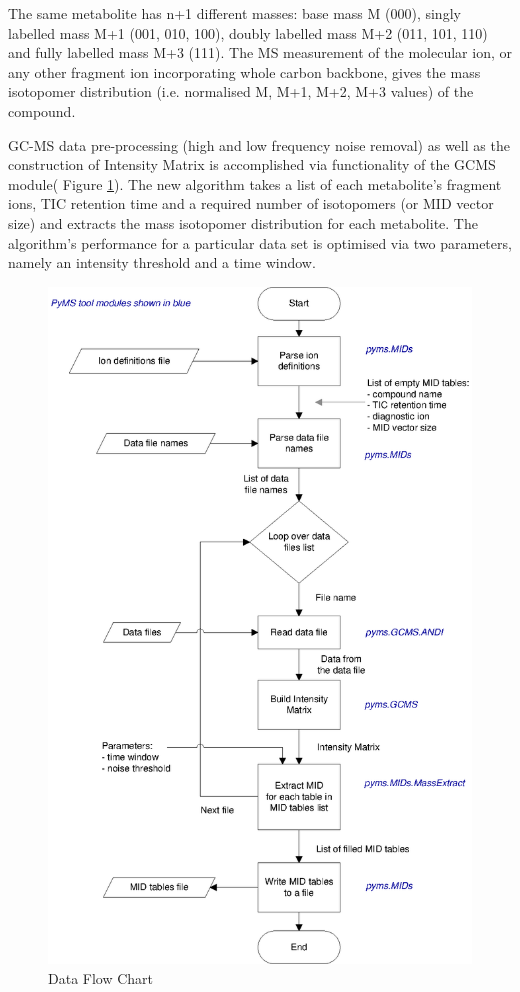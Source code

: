 The same metabolite has n+1 different masses: base mass M (000), singly labelled
mass M+1 (001, 010, 100), doubly labelled mass M+2 (011, 101, 110) and fully 
labelled mass M+3 (111). The MS measurement of the molecular ion, or any other 
fragment ion incorporating whole carbon backbone,  gives the mass isotopomer 
distribution (i.e. normalised M, M+1, M+2, M+3 values) of the compound.

GC-MS data pre-processing (high and low frequency noise removal) as well as the 
construction of Intensity Matrix is accomplished via functionality of the GCMS 
module( Figure \ref{fig:81}). The new algorithm takes a list of each 
metabolite’s fragment ions, TIC retention time and a required number of 
isotopomers (or MID vector size) and extracts the mass isotopomer distribution 
for each metabolite. The algorithm’s performance for a particular data set is 
optimised via two parameters, namely an intensity threshold and a time window.

\begin{figure}
  \begin{center}
    \includegraphics[scale=1]{graphics/chapter08/81.eps}
  \end{center}
  \caption{Data Flow Chart}
  \label{fig:81}
\end{figure}

